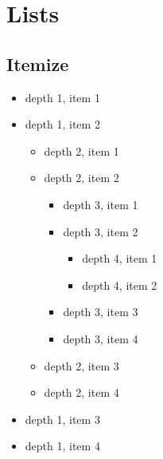 \documentclass[itdr]{subfiles}
\begin{document}
\vfill
\clearpage

\section{Lists}

\subsection{Itemize}
\begin{itemize}[leftmargin=*]
	\item depth 1, item 1
	\item depth 1, item 2
	\begin{itemize}
		\item depth 2, item 1
		\item depth 2, item 2
		\begin{itemize}
			\item depth 3, item 1
			\item depth 3, item 2
			\begin{itemize}
				\item depth 4, item 1
				\item depth 4, item 2
			\end{itemize}
			\item depth 3, item 3
			\item depth 3, item 4
		\end{itemize}
		\item depth 2, item 3
		\item depth 2, item 4
	\end{itemize}
	\item depth 1, item 3
	\item depth 1, item 4
\end{itemize}

\vfill
\end{document}
